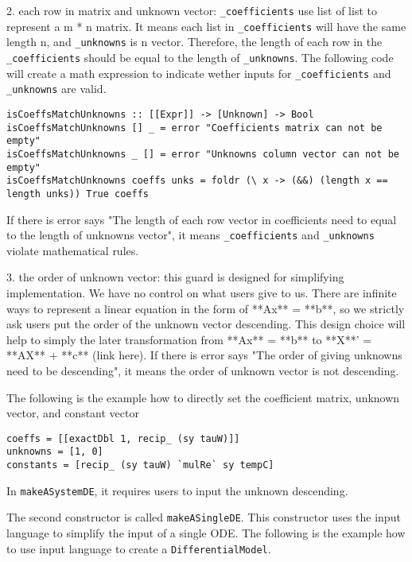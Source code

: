 2. each row in matrix and unknown vector: \verb|_coefficients| use list of list to represent a m * n matrix. It means each list in \verb|_coefficients| will have the same length n, and \verb|_unknowns| is n vector. Therefore, the length of each row in the \verb|_coefficients| should be equal to the length of \verb|_unknowns|. The following code will create a math expression to indicate wether inputs for \verb|_coefficients| and \verb|_unknowns| are valid.

\begin{lstlisting}[language=HaskellUlisses]
isCoeffsMatchUnknowns :: [[Expr]] -> [Unknown] -> Bool
isCoeffsMatchUnknowns [] _ = error "Coefficients matrix can not be empty"
isCoeffsMatchUnknowns _ [] = error "Unknowns column vector can not be empty"
isCoeffsMatchUnknowns coeffs unks = foldr (\ x -> (&&) (length x == length unks)) True coeffs
\end{lstlisting}

If there is error says "The length of each row vector in coefficients need to equal to the length of unknowns vector", it means \verb|_coefficients| and \verb|_unknowns| violate mathematical rules.

3. the order of unknown vector: this guard is designed for simplifying implementation. We have no control on what users give to us. There are infinite ways to represent a linear equation in the form of **Ax** = **b**, so we strictly ask users put the order of the unknown vector descending. This design choice will help to simply the later transformation from **Ax** = **b** to **X**' = **AX** + **c** (link here). If there is error says "The order of giving unknowns need to be descending", it means the order of unknown vector is not descending.

The following is the example how to directly set the coefficient matrix, unknown vector, and constant vector

\begin{lstlisting}[language=HaskellUlisses]
coeffs = [[exactDbl 1, recip_ (sy tauW)]]
unknowns = [1, 0]
constants = [recip_ (sy tauW) `mulRe` sy tempC]
\end{lstlisting}

In \verb|makeASystemDE|, it requires users to input the unknown descending.

The second constructor is called \verb|makeASingleDE|. This constructor uses the input language to simplify the input of a single ODE. The following is the example how to use input language to create a \verb|DifferentialModel|.

